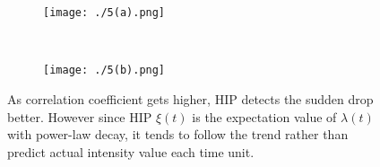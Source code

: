 \documentclass[10pt,letterpaper]{article}
\begin{document}
\begin{figure}[H]
\begin{adjustwidth}{-2.25in}{0in} %
	\centering
	\begin{subfigure}[b]{0.43\paperwidth}\texttt{[image: ./5(a).png]}
\caption{}
	\label{fig5(a)}
	\end{subfigure}
	~
	\begin{subfigure}[b]{0.43\paperwidth}
	\texttt{[image: ./5(b).png]}
	\caption{}
	\label{fig5(b)}
	\end{subfigure}
\caption{{As correlation coefficient gets higher, HIP detects the sudden drop better. However since HIP $\xi(t)$ is the expectation value of $\lambda(t)$ with power-law decay, it tends to follow the trend rather than predict actual intensity value each time unit.}}
\end{adjustwidth}
\label{fig5}
\end{figure}
\end{document}
